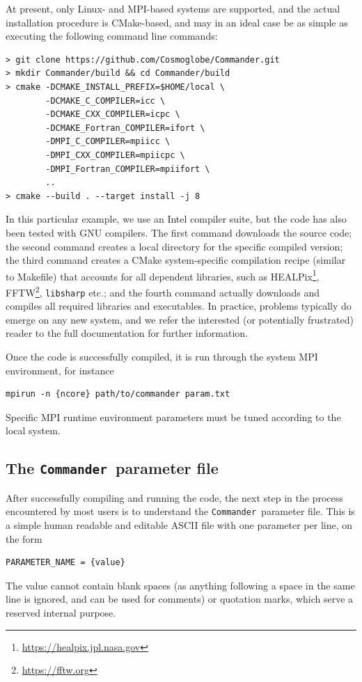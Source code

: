 \documentclass[twocolumn]{aa}
\def\commander{\texttt{Commander}}
\begin{document}
At present, only Linux- and MPI-based systems are supported, and the
actual installation procedure is CMake-based, and may in an ideal
case be as simple as executing the following command line commands:
{\small
\begin{verbatim}
> git clone https://github.com/Cosmoglobe/Commander.git 
> mkdir Commander/build && cd Commander/build
> cmake -DCMAKE_INSTALL_PREFIX=$HOME/local \
        -DCMAKE_C_COMPILER=icc \
        -DCMAKE_CXX_COMPILER=icpc \
        -DCMAKE_Fortran_COMPILER=ifort \
        -DMPI_C_COMPILER=mpiicc \
        -DMPI_CXX_COMPILER=mpiicpc \
        -DMPI_Fortran_COMPILER=mpiifort \
        ..
> cmake --build . --target install -j 8
\end{verbatim}
} In this particular example, we use an Intel compiler suite, but the
code has also been tested with GNU compilers. The first command
downloads the source code; the second command creates a local
directory for the specific compiled version; the third command creates
a CMake system-specific compilation recipe (similar to Makefile) that
accounts for all dependent libraries, such as
HEALPix\footnote{\url{https://healpix.jpl.nasa.gov}},
FFTW\footnote{\url{https://fftw.org}}, \texttt{libsharp} etc.; and the
fourth command actually downloads and compiles all required libraries
and executables. In practice, problems typically do emerge on any new
system, and we refer the interested (or potentially frustrated) reader
to the full documentation for further information.

Once the code is successfully compiled, it is run through the system
MPI environment, for instance
\begin{verbatim}
mpirun -n {ncore} path/to/commander param.txt
\end{verbatim}
Specific MPI runtime environment parameters must be tuned according to
the local system.

\subsection{The \commander\ parameter file}

After successfully compiling and running the code, the next step in
the process encountered by most users is to understand the
\commander\ parameter file. This is a simple human readable and
editable ASCII file with one parameter per line, on the form
\begin{verbatim}
PARAMETER_NAME = {value}
\end{verbatim}
The value cannot contain blank spaces (as anything following a space
in the same line is ignored, and can be used for comments) or
quotation marks, which serve a reserved internal purpose.
\end{document}
